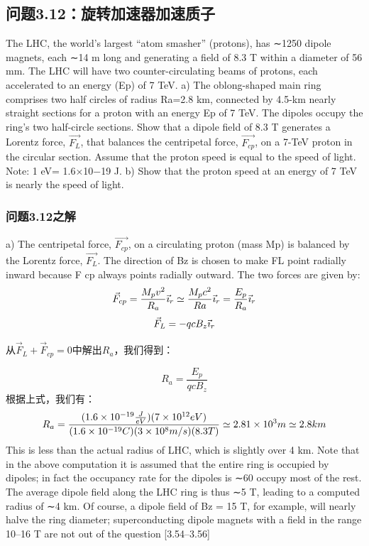 \subsection{问题3.12：旋转加速器加速质子}
The LHC, the world’s largest “atom smasher” (protons), has ∼1250 dipole magnets, each ∼14 m long and generating a field of 8.3 T within a diameter of 56 mm.
The LHC will have two counter-circulating beams of protons, each accelerated to
an energy (Ep) of 7 TeV.
a) The oblong-shaped main ring comprises two half circles of radius Ra=2.8 km,
connected by 4.5-km nearly straight sections for a proton with an energy
Ep
of 7 TeV. The dipoles occupy the ring’s two half-circle sections. Show
that a dipole field of 8.3 T generates a Lorentz force, $\vec{F_L}$, that balances the
centripetal force, $\vec{F_{cp}}$, on a 7-TeV proton in the circular section. Assume that
the proton speed is equal to the speed of light. Note: 1 eV= 1.6×10−19 J.
b) Show that the proton speed at an energy of 7 TeV is nearly the speed of light.

\subsubsection{问题3.12之解}
a) The centripetal force, $\vec{F_{cp}}$, on a circulating proton (mass Mp) is balanced by
the Lorentz force, $\vec{F_L}$. The direction of Bz is chosen to make FL point radially
inward because F
cp always points radially outward. The two forces are given by:
$$
\vec{F}_{cp}=\frac{M_{p}v^{2}}{R_{a}}\vec{\imath}_{r}\simeq\frac{M_{p}c^{2}}{Ra}\vec{\imath}_{r}=\frac{E_{p}}{R_{a}}\vec{\imath}_{r}\\%
$$
$$
\vec{F}_{L}=-qcB_{z}\vec{\imath}_{r}\\%
$$

从$\vec{F}_{L}+\vec{F}_{cp}=0$中解出$R_a$，我们得到：

$$
R_a=\frac{E_p}{q c B_z} %
$$
根据上式，我们有：
$$
R_{a}=\frac{(1.6\times10^{-19}\frac{J}{eV})(7\times10^{12}eV)}{(1.6\times10^{-19}C)(3\times10^{8}m/s)(8.3T)}\\
\simeq2.81\times10^{3}m\simeq2.8km\\
$$
This is less than the actual radius of LHC, which is slightly over 4 km. Note that in
the above computation it is assumed that the entire ring is occupied by dipoles; in
fact the occupancy rate for the dipoles is ∼60%
occupy most of the rest. The average dipole field along the LHC ring is thus ∼5 T,
leading to a computed radius of ∼4 km. Of course, a dipole field of Bz = 15 T,
for example, will nearly halve the ring diameter; superconducting dipole magnets
with a field in the range 10–16 T are not out of the question [3.54–3.56]

